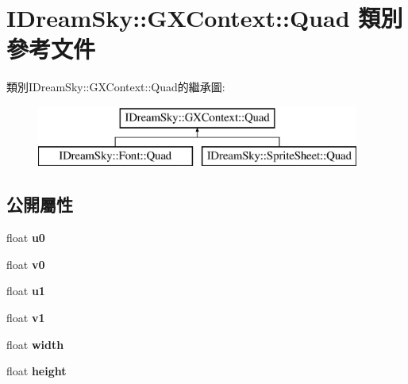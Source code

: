 \hypertarget{class_i_dream_sky_1_1_g_x_context_1_1_quad}{}\section{I\+Dream\+Sky\+:\+:G\+X\+Context\+:\+:Quad 類別 參考文件}
\label{class_i_dream_sky_1_1_g_x_context_1_1_quad}
類別\+I\+Dream\+Sky\+:\+:G\+X\+Context\+:\+:Quad的繼承圖\+:\begin{figure}[H]
\begin{center}
\leavevmode
\includegraphics[height=2.000000cm]{class_i_dream_sky_1_1_g_x_context_1_1_quad}
\end{center}
\end{figure}
\subsection*{公開屬性}
\begin{DoxyCompactItemize}
\item 
float {\bfseries u0}\hypertarget{class_i_dream_sky_1_1_g_x_context_1_1_quad_ac9c35c77205f97b38891f186a7da51b7}{}\label{class_i_dream_sky_1_1_g_x_context_1_1_quad_ac9c35c77205f97b38891f186a7da51b7}

\item 
float {\bfseries v0}\hypertarget{class_i_dream_sky_1_1_g_x_context_1_1_quad_a0c065fc68e60481dc40aea79d3ce44de}{}\label{class_i_dream_sky_1_1_g_x_context_1_1_quad_a0c065fc68e60481dc40aea79d3ce44de}

\item 
float {\bfseries u1}\hypertarget{class_i_dream_sky_1_1_g_x_context_1_1_quad_a597a83f32bb08eaa4137ae5d0c2ee7cd}{}\label{class_i_dream_sky_1_1_g_x_context_1_1_quad_a597a83f32bb08eaa4137ae5d0c2ee7cd}

\item 
float {\bfseries v1}\hypertarget{class_i_dream_sky_1_1_g_x_context_1_1_quad_abe4b90722b3e2f793cab136dcb51ad07}{}\label{class_i_dream_sky_1_1_g_x_context_1_1_quad_abe4b90722b3e2f793cab136dcb51ad07}

\item 
float {\bfseries width}\hypertarget{class_i_dream_sky_1_1_g_x_context_1_1_quad_a988b5db84622bbaf80faa462dcc85db3}{}\label{class_i_dream_sky_1_1_g_x_context_1_1_quad_a988b5db84622bbaf80faa462dcc85db3}

\item 
float {\bfseries height}\hypertarget{class_i_dream_sky_1_1_g_x_context_1_1_quad_a4811be94789405ff5f2977025cb395fe}{}\label{class_i_dream_sky_1_1_g_x_context_1_1_quad_a4811be94789405ff5f2977025cb395fe}

\end{DoxyCompactItemize}


